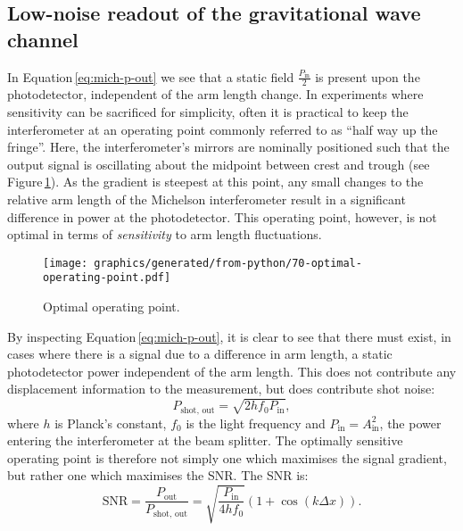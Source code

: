 \subsection{Low-noise readout of the gravitational wave channel}
In Equation\,\ref{eq:mich-p-out} we see that a static field $\frac{P_{\text{in}}}{2}$ is present upon the photodetector, independent of the arm length change. In experiments where sensitivity can be sacrificed for simplicity, often it is practical to keep the interferometer at an operating point commonly referred to as ``half way up the fringe''. Here, the interferometer's mirrors are nominally positioned such that the output signal is oscillating about the midpoint between crest and trough (see Figure\,\ref{fig:optimal-operating-point}). As the gradient is steepest at this point, any small changes to the relative arm length of the Michelson interferometer result in a significant difference in power at the photodetector. This operating point, however, is not optimal in terms of \emph{sensitivity} to arm length fluctuations.

\begin{figure}
  \centering
  \texttt{[image: graphics/generated/from-python/70-optimal-operating-point.pdf]}
  \caption[Fringe]{\label{fig:optimal-operating-point}Optimal operating point.}
\end{figure}

By inspecting Equation\,\ref{eq:mich-p-out}, it is clear to see that there must exist, in cases where there is a signal due to a difference in arm length, a static photodetector power independent of the arm length. This does not contribute any displacement information to the measurement, but does contribute shot noise:
\begin{equation}
  P_{\text{shot, out}} = \sqrt{2 h f_0 P_{\text{in}}},
\end{equation}
where $h$ is Planck's constant, $f_0$ is the light frequency and $P_{\text{in}} = A_{\text{in}}^2$, the power entering the interferometer at the beam splitter. The optimally sensitive operating point is therefore not simply one which maximises the signal gradient, but rather one which maximises the \gls{SNR}. The \gls{SNR} is:
\begin{equation}
  \text{SNR} = \frac{P_{\text{out}}}{P_{\text{shot, out}}} = \sqrt{\frac{P_{\text{in}}}{4 h f_0}} \left( 1 + \cos \left(k \Delta x \right) \right).
\end{equation}

